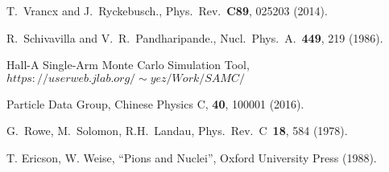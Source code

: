 \begin{thebibliography}{}
 T.~Vrancx and J.~Ryckebusch., Phys.~Rev.~\textbf{C89},
025203 (2014).

    R.~Schivavilla and V.~R.~Pandharipande.,
Nucl.~Phys.~A.~\textbf{449}, 219 (1986).

 Hall-A Single-Arm Monte Carlo Simulation Tool,\\
$https://userweb.jlab.org/ \sim yez/Work/SAMC/$

 Particle Data Group, Chinese Physics C, \textbf{40}, 100001
(2016).

 G.~Rowe, M.~Solomon, R.H.~Landau, Phys.~Rev.~C~\textbf{18}, 584
(1978).

 T. Ericson, W. Weise, ``Pions and Nuclei'', Oxford University
Press (1988).


\end{thebibliography}

